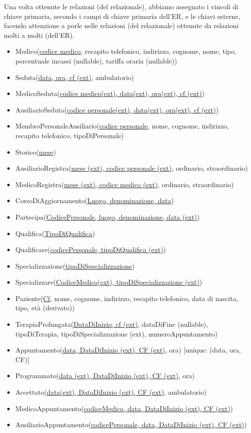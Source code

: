 \documentclass[11pt]{article}
\begin{document}
Una volta ottenute le relazioni (del relazionale), abbiamo assegnato i vincoli di chiave primaria, secondo i campi di chiave primaria dell'ER, e le chiavi esterne, facendo attenzione a porle nelle relazioni (del relazionale) ottenute da relazioni molti a molti (dell'ER).

\begin{itemize}
    \item Medico(\underline{codice medico}, recapito telefonico, indirizzo, cognome, nome, tipo, percentuale incassi (nullable), tariffa oraria (nullable))
    \item Seduta(\underline{data, ora, cf (ext)}, ambulatorio)
    \item MedicoSeduta(\underline{codice medico(ext), data(ext), ora(ext), cf (ext)})
    \item AusiliarioSeduta(\underline{codice personale(ext), data(ext), ora(ext), cf (ext)})
    \item MembroPersonaleAusiliario(\underline{codice personale}, nome, cognome, indirizzo, recapito telefonico, tipoDiPersonale)
    \item Storico(\underline{mese})
    \item AusiliarioRegistra(\underline{mese (ext), codice personale (ext)}, ordinario, straordinario)
    \item MedicoRegistra(\underline{mese (ext), codice medico (ext)}, ordinario, straordinario)
    \item CorsoDiAggiornamento(\underline{Luogo, denominazione, data})
    \item Partecipa(\underline{CodicePersonale, luogo, denominazione, data (ext)})
    \item Qualifica(\underline{TipoDiQualifica})
    \item Qualificare(\underline{codicePersonale, tipoDiQualifica (ext)})
    \item Specializzazione(\underline{tipoDiSpecializzazione})
    \item Specializzare(\underline{CodiceMedico(ext), tipoDiSpecializzazione (ext)})
    \item Paziente(\underline{Cf}, nome, cognome, indirizzo, recapito telefonico, data di nascita, tipo, età (derivato))
    \item TerapiaProlungata(\underline{DataDiInizio, cf (ext)}, dataDiFine (nullable), tipoDiTerapia, tipoDiSpecializzazione (ext), numeroAppuntamento)
    \item Appuntamento(\underline{data, DataDiInizio (ext), CF (ext)}, ora) [unique: (data, ora, CF)]
    \item Programmato(\underline{data (ext), DataDiInizio (ext), CF (ext)}, ora)
    \item Accettato(\underline{data(ext), DataDiInizio (ext), CF (ext)}, ambulatorio)
    \item MedicoAppuntamento(\underline{codiceMedico, data, DataDiInizio (ext), CF (ext)})
    \item AusiliarioAppuntamento(\underline{codicePersonale, data, DataDiInizio (ext), CF (ext)})
\end{itemize}
\end{document}
